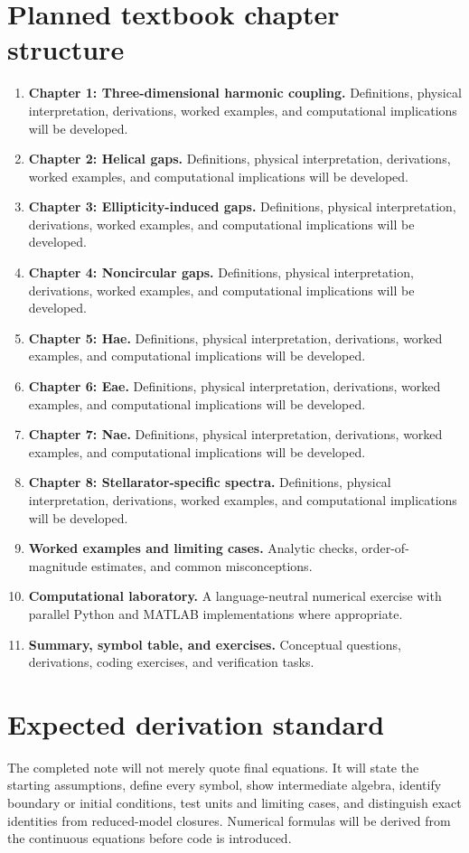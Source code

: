 \documentclass[11pt]{article}
\begin{document}
\section{Planned textbook chapter structure}
\begin{enumerate}[leftmargin=1.8em]
\item \textbf{Chapter 1: Three-dimensional harmonic coupling.} Definitions, physical interpretation, derivations, worked examples, and computational implications will be developed.
\item \textbf{Chapter 2: Helical gaps.} Definitions, physical interpretation, derivations, worked examples, and computational implications will be developed.
\item \textbf{Chapter 3: Ellipticity-induced gaps.} Definitions, physical interpretation, derivations, worked examples, and computational implications will be developed.
\item \textbf{Chapter 4: Noncircular gaps.} Definitions, physical interpretation, derivations, worked examples, and computational implications will be developed.
\item \textbf{Chapter 5: Hae.} Definitions, physical interpretation, derivations, worked examples, and computational implications will be developed.
\item \textbf{Chapter 6: Eae.} Definitions, physical interpretation, derivations, worked examples, and computational implications will be developed.
\item \textbf{Chapter 7: Nae.} Definitions, physical interpretation, derivations, worked examples, and computational implications will be developed.
\item \textbf{Chapter 8: Stellarator-specific spectra.} Definitions, physical interpretation, derivations, worked examples, and computational implications will be developed.
\item \textbf{Worked examples and limiting cases.} Analytic checks, order-of-magnitude estimates, and common misconceptions.
\item \textbf{Computational laboratory.} A language-neutral numerical exercise with parallel Python and MATLAB implementations where appropriate.
\item \textbf{Summary, symbol table, and exercises.} Conceptual questions, derivations, coding exercises, and verification tasks.
\end{enumerate}

\section{Expected derivation standard}
The completed note will not merely quote final equations. It will state the starting assumptions, define every symbol, show intermediate algebra, identify boundary or initial conditions, test units and limiting cases, and distinguish exact identities from reduced-model closures. Numerical formulas will be derived from the continuous equations before code is introduced.
\end{document}
